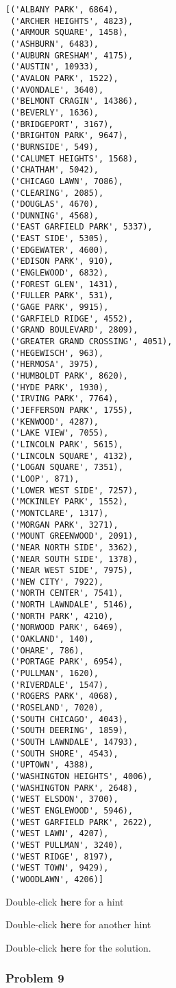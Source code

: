 \documentclass[11pt]{article}
\makeatletter
\newcommand{\boxspacing}{\kern\kvtcb@left@rule\kern\kvtcb@boxsep}
\newcommand{\prompt}[4]{
        \ttfamily\llap{{\color{#2}[#3]:\hspace{3pt}#4}}\vspace{-\baselineskip}
    }
\makeatother
\begin{document}
            \begin{tcolorbox}[breakable, size=fbox, boxrule=.5pt, pad at break*=1mm, opacityfill=0]
\prompt{Out}{outcolor}{47}{\boxspacing}
\begin{Verbatim}[commandchars=\\\{\}]
[('ALBANY PARK', 6864),
 ('ARCHER HEIGHTS', 4823),
 ('ARMOUR SQUARE', 1458),
 ('ASHBURN', 6483),
 ('AUBURN GRESHAM', 4175),
 ('AUSTIN', 10933),
 ('AVALON PARK', 1522),
 ('AVONDALE', 3640),
 ('BELMONT CRAGIN', 14386),
 ('BEVERLY', 1636),
 ('BRIDGEPORT', 3167),
 ('BRIGHTON PARK', 9647),
 ('BURNSIDE', 549),
 ('CALUMET HEIGHTS', 1568),
 ('CHATHAM', 5042),
 ('CHICAGO LAWN', 7086),
 ('CLEARING', 2085),
 ('DOUGLAS', 4670),
 ('DUNNING', 4568),
 ('EAST GARFIELD PARK', 5337),
 ('EAST SIDE', 5305),
 ('EDGEWATER', 4600),
 ('EDISON PARK', 910),
 ('ENGLEWOOD', 6832),
 ('FOREST GLEN', 1431),
 ('FULLER PARK', 531),
 ('GAGE PARK', 9915),
 ('GARFIELD RIDGE', 4552),
 ('GRAND BOULEVARD', 2809),
 ('GREATER GRAND CROSSING', 4051),
 ('HEGEWISCH', 963),
 ('HERMOSA', 3975),
 ('HUMBOLDT PARK', 8620),
 ('HYDE PARK', 1930),
 ('IRVING PARK', 7764),
 ('JEFFERSON PARK', 1755),
 ('KENWOOD', 4287),
 ('LAKE VIEW', 7055),
 ('LINCOLN PARK', 5615),
 ('LINCOLN SQUARE', 4132),
 ('LOGAN SQUARE', 7351),
 ('LOOP', 871),
 ('LOWER WEST SIDE', 7257),
 ('MCKINLEY PARK', 1552),
 ('MONTCLARE', 1317),
 ('MORGAN PARK', 3271),
 ('MOUNT GREENWOOD', 2091),
 ('NEAR NORTH SIDE', 3362),
 ('NEAR SOUTH SIDE', 1378),
 ('NEAR WEST SIDE', 7975),
 ('NEW CITY', 7922),
 ('NORTH CENTER', 7541),
 ('NORTH LAWNDALE', 5146),
 ('NORTH PARK', 4210),
 ('NORWOOD PARK', 6469),
 ('OAKLAND', 140),
 ('OHARE', 786),
 ('PORTAGE PARK', 6954),
 ('PULLMAN', 1620),
 ('RIVERDALE', 1547),
 ('ROGERS PARK', 4068),
 ('ROSELAND', 7020),
 ('SOUTH CHICAGO', 4043),
 ('SOUTH DEERING', 1859),
 ('SOUTH LAWNDALE', 14793),
 ('SOUTH SHORE', 4543),
 ('UPTOWN', 4388),
 ('WASHINGTON HEIGHTS', 4006),
 ('WASHINGTON PARK', 2648),
 ('WEST ELSDON', 3700),
 ('WEST ENGLEWOOD', 5946),
 ('WEST GARFIELD PARK', 2622),
 ('WEST LAWN', 4207),
 ('WEST PULLMAN', 3240),
 ('WEST RIDGE', 8197),
 ('WEST TOWN', 9429),
 ('WOODLAWN', 4206)]
\end{Verbatim}
\end{tcolorbox}
        
    Double-click \textbf{here} for a hint

    Double-click \textbf{here} for another hint

    Double-click \textbf{here} for the solution.

    \hypertarget{problem-9}{%
\subsubsection{Problem 9}\label{problem-9}}
\end{document}
